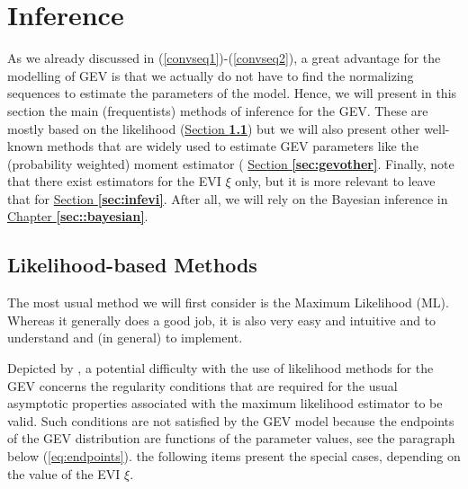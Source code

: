 \section{Inference}\label{sec::gevinfernce} 

As we already discussed in (\ref{convseq1})-(\ref{convseq2}), a great advantage for the modelling of GEV is that we actually do not have to find the normalizing sequences to estimate the parameters of the model. Hence, we will present in this section the main (frequentists) methods of inference for the GEV. These are mostly based on the likelihood (\hyperref[likgevintro]{Section\textbf{ \ref{likgevintro}}}) but we will also present other well-known methods that are widely used to estimate GEV parameters like the (probability weighted) moment estimator ( \hyperref[sec:gevother]{Section \textbf{\ref{sec:gevother}}}. Finally, note that there exist estimators for the EVI $\xi$ only, but it is more relevant to leave that for \hyperref[sec:infevi]{Section \textbf{\ref{sec:infevi}}}. After all, we will rely on the Bayesian inference in \hyperref[sec::bayesian]{Chapter \textbf{\ref{sec::bayesian}}}.


\subsection{Likelihood-based Methods}\label{likgevintro}

The most usual method we will first consider is the Maximum Likelihood (ML). Whereas it generally does a good job, it is also very easy and intuitive and to understand and (in general) to implement.

Depicted by \citet{smith_maximum_1985-1}, a potential difficulty with the use of likelihood methods for the GEV concerns the regularity conditions that are required for the usual asymptotic properties associated with the maximum likelihood estimator to be valid. Such conditions are not satisfied by the GEV
model because the endpoints of the GEV distribution are functions of the parameter values, see the paragraph below (\ref{eq:endpoints}). the following items present the special cases, depending on the value of the EVI $\xi$.

